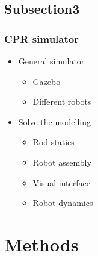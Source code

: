 \documentclass[compress]{thesisbeamer}
\begin{document}
		\subsection{Subsection3}
        \begin{frame}
        	\frametitle{CPR simulator}
			\begin{itemize}%
  				\item General simulator 
  				\begin{itemize}%
   					\item Gazebo
   					\item Different robots
  				\end{itemize}
  				\item Solve the modelling
  				\begin{itemize}%
   					\item Rod statics
   					\item Robot assembly
   					\item Visual interface
   					\item Robot dynamics
  				\end{itemize}
 			\end{itemize}
		\end{frame}


        \section{Methods}
\end{document}
